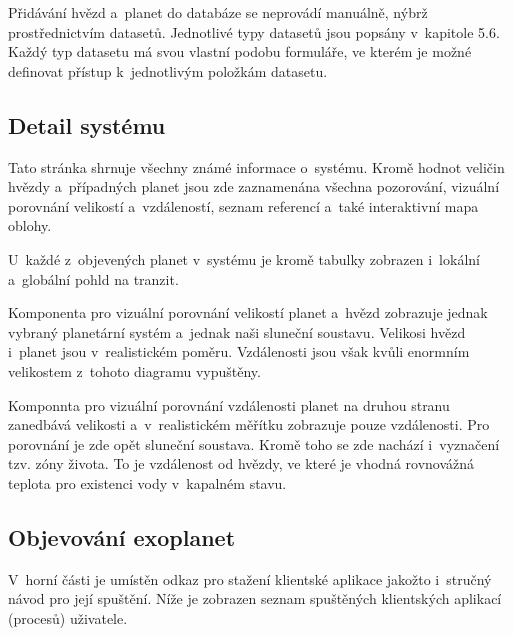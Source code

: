 \documentclass[a4paper,12pt]{article}
\begin{document}
{{{{{{{{{{{

Přidávání hvězd a~planet do databáze se neprovádí manuálně, nýbrž prostřednictvím datasetů. Jednotlivé typy datasetů jsou popsány v~kapitole 5.6. Každý typ datasetu má svou vlastní podobu formuláře, ve kterém je možné definovat přístup k~jednotlivým položkám datasetu.

\clearpage

\subsection{Detail systému}

Tato stránka shrnuje všechny známé informace o~systému. Kromě hodnot veličin hvězdy a~případných planet jsou zde zaznamenána všechna pozorování, vizuální porovnání velikostí a~vzdáleností, seznam referencí a~také interaktivní mapa oblohy.


U~každé z~objevených planet v~systému je kromě tabulky zobrazen i~lokální a~globální pohld na tranzit.



Komponenta pro vizuální porovnání velikostí planet a~hvězd zobrazuje jednak vybraný planetární systém a~jednak naši sluneční soustavu. Velikosi hvězd i~planet jsou v~realistickém poměru. Vzdálenosti jsou však kvůli enormním velikostem z~tohoto diagramu vypuštěny.


Komponnta pro vizuální porovnání vzdálenosti planet na druhou stranu zanedbává velikosti a~v~realistickém měřítku zobrazuje pouze vzdálenosti. Pro porovnání je zde opět sluneční soustava. Kromě toho se zde nachází i~vyznačení tzv. zóny života. To je vzdálenost od hvězdy, ve které je vhodná rovnovážná teplota pro existenci vody v~kapalném stavu.


\clearpage

\subsection{Objevování exoplanet}

\vspace{-8pt}

V~horní části je umístěn odkaz pro stažení klientské aplikace jakožto i~stručný návod pro její spuštění. Níže je zobrazen seznam spuštěných klientských aplikací (procesů) uživatele.

}}}}}}}}}}}
\end{document}
